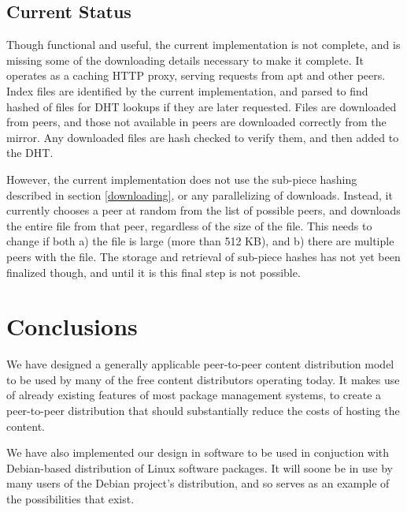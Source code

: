 \documentclass[conference]{IEEEtran}
\begin{document}
\subsection{Current Status}
\label{status}

Though functional and useful, the current implementation is not
complete, and is missing some of the downloading details necessary
to make it complete. It operates as a caching HTTP proxy, serving
requests from apt and other peers. Index files are identified by the
current implementation, and parsed to find hashed of files for DHT
lookups if they are later requested. Files are downloaded from
peers, and those not available in peers are downloaded correctly
from the mirror. Any downloaded files are hash checked to verify
them, and then added to the DHT.

However, the current implementation does not use the sub-piece
hashing described in section \ref{downloading}, or any parallelizing
of downloads. Instead, it currently chooses a peer at random from
the list of possible peers, and downloads the entire file from that
peer, regardless of the size of the file. This needs to change if
both a) the file is large (more than 512 KB), and b) there are
multiple peers with the file. The storage and retrieval of sub-piece
hashes has not yet been finalized though, and until it is this final
step is not possible.


\section{Conclusions}
\label{conclusions}

We have designed a generally applicable peer-to-peer content
distribution model to be used by many of the free content
distributors operating today. It makes use of already existing
features of most package management systems, to create a
peer-to-peer distribution that should substantially reduce the costs
of hosting the content.

We have also implemented our design in software to be used in
conjuction with Debian-based distribution of Linux software
packages. It will soone be in use by many users of the Debian
project's distribution, and so serves as an example of the
possibilities that exist.



\end{document}
